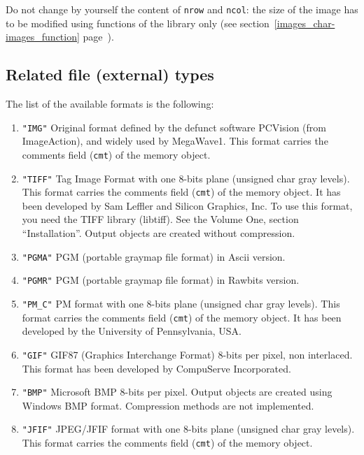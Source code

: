 Do not change by yourself the content of \verb+nrow+ and \verb+ncol+: the size
of the image has to be modified using functions of the library only (see section~\ref{images_char-images_function} page~\pageref{images_char-images_function}).

\subsection{Related file (external) types}
\label{images_char-file_type}

The list of the available formats is the following:
\begin{enumerate}
\item \verb+"IMG"+ Original format defined by the defunct software PCVision (from ImageAction), and widely used by MegaWave1.
This format carries the comments field (\verb+cmt+) of the memory object.
\item \verb+"TIFF"+ Tag Image Format with one 8-bits plane (unsigned char gray levels).
This format carries the comments field (\verb+cmt+) of the memory object.
It has been developed by Sam Leffler and Silicon Graphics, Inc.
To use this format, you need the TIFF library (libtiff). See the Volume One, section 
``Installation''. Output objects are created without compression.
\item \verb+"PGMA"+ PGM (portable graymap file format) in Ascii version.
\item \verb+"PGMR"+ PGM (portable graymap file format) in Rawbits version.
\item \verb+"PM_C"+ PM format with one 8-bits plane (unsigned char gray levels).
This format carries the comments field (\verb+cmt+) of the memory object.
It has been developed by the University of Pennsylvania, USA.
\item \verb+"GIF"+ GIF87 (Graphics Interchange Format) 8-bits per pixel, non interlaced.
This format has been developed by CompuServe Incorporated.
\item \verb+"BMP"+  Microsoft BMP 8-bits per pixel.
Output objects are created using Windows BMP format. Compression methods are not implemented.
\item \verb+"JFIF"+ JPEG/JFIF format with one 8-bits plane (unsigned char gray levels).
This format carries the comments field (\verb+cmt+) of the memory object.

\end{enumerate}
